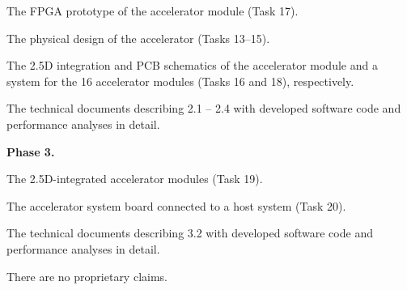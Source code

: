  The FPGA prototype of the accelerator module (Task 17).

 The physical design of the accelerator (Tasks 13--15).

 The 2.5D integration and PCB schematics of the accelerator module and a system for the 16 accelerator modules (Tasks 16 and 18), respectively.

 The technical documents describing 2.1 -- 2.4 with developed software code and performance analyses in detail.


\vspace{3pt}
\noindent
\textbf{Phase 3.}

 The 2.5D-integrated accelerator modules (Task 19).

 The accelerator system board connected to a host system (Task 20).

 The technical documents describing 3.2 with developed software code and performance analyses in detail.


\noindent
There are no proprietary claims.
